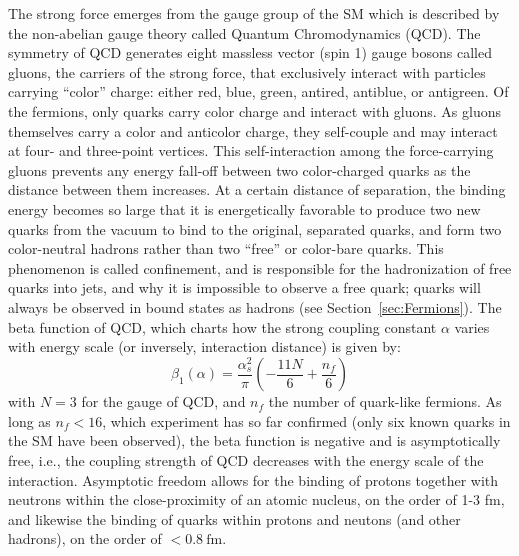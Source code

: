 The strong force emerges from the \SUthreeC gauge group of the SM which is described by the non-abelian gauge theory called Quantum Chromodynamics (QCD). The \SUthreeC symmetry of QCD generates eight massless vector (spin 1) gauge bosons called gluons, the carriers of the strong force, that exclusively interact with particles carrying ``color'' charge: either red, blue, green, antired, antiblue, or antigreen. Of the fermions, only quarks carry color charge and interact with gluons. As gluons themselves carry a color and anticolor charge, they self-couple and may interact at four- and three-point vertices. This self-interaction among the force-carrying gluons prevents any energy fall-off between two color-charged quarks as the distance between them increases. At a certain distance of separation, the binding energy becomes so large that it is energetically favorable to produce two new quarks from the vacuum to bind to the original, separated quarks, and form two color-neutral hadrons rather than two ``free'' or color-bare quarks. This phenomenon is called confinement, and is responsible for the hadronization of free quarks into jets, and why it is impossible to observe a free quark; quarks will always be observed in bound states as hadrons (see Section~\ref{sec:Fermions}).
The beta function of QCD, which charts how the strong coupling constant $\alpha$ varies with energy scale (or inversely, interaction distance) is given by:
\begin{equation}
    \beta_1(\alpha) = \frac{\alpha_s^2}{\pi}\left(-\frac{11N}{6}+\frac{n_f}{6}\right)
\end{equation}
with $N = 3$ for the \SUthree gauge of QCD, and $n_f$ the number of quark-like fermions. As long as $n_f < 16$, which experiment has so far confirmed (only six known quarks in the SM have been observed), the beta function is negative and is asymptotically free, i.e., the coupling strength of QCD decreases with the energy scale of the interaction. Asymptotic freedom allows for the binding of protons together with neutrons within the close-proximity of an atomic nucleus, on the order of 1-3 fm, and likewise the binding of quarks within protons and neutons (and other hadrons), on the order of $< \SI{0.8}{\femto\m}$. 